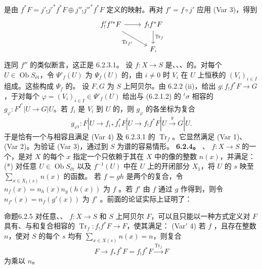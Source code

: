 是由 $f^*F=j'_!j'^*f^*F\oplus j''_!j''^*f^*F$ 定义的映射。再对 $f'=f\circ j'$ 应用 (Var 3)，得到
\[\begin{tikzcd}f'_!f'^*F\arrow[r]\arrow[dr,"\operatorname{Tr}_{f'}"']&f_!f^*F\arrow[d,"\operatorname{Tr}_f"]\\&F,\end{tikzcd}\]
连同 $f''$ 的类似断言，这正是 6.2.3.1。
设 $f:X\to S$ 是、、、的。对每个 $U\in\operatorname{Ob}S_{\text{ét}}$，令 $\Psi'_f(U)$ 为 $\Psi_f(U)$ 的，由 $i\ne0$ 时 $V_i$ 在 $U$ 上恒秩的 $(V_i)_{i\in I}$ 组成。这些构成 $\Psi_f$ 的。
设 $F,G$ 为 $S$ 上阿贝尔。由 6.2.2 (ii)，给出 $g:f_!f^*F\to G$，于对每个 $\varphi=(V_i)_{i\in I}\in\Psi'_f(U)$ 给出与 (6.2.1.2) 的 ${}^t\sigma$ 相容的 $g_\varphi:F^{I^*}|U\to G|U$。若 $f_i$ 是 $V_i$ 到 $U$ 的，则 $g_\varphi$ 的各坐标为复合
\[g_{\varphi i}:F|U\longrightarrow f_{i*}f_i^*F|U\longrightarrow f_!f^*F|U\xrightarrow{g}G|U.\]
于是恰有一个与相容且满足 (Var 4) 及 6.2.3.1 的 $\operatorname{Tr}_f$。它显然满足 (Var 1)、(Var 2)。为验证 (Var 3)，通过到 $S$ 为谱的容易情形。
\textbf{6.2.4。} 、 $f:X\to S$ 的一个，是对 $X$ 的每个 $x$ 指定一个只依赖于其在 $X$ 中的像的整数 $n(x)$，并满足：
(*) 对任意 $U\in\operatorname{Ob}S_{\text{ét}}$ 以及 $f^{-1}(U)$ 中在 $U$ 上的开闭部分 $X_1$，将 $U$ 的 $s$ 映至 $\sum_{x\in X_1(s)}n(x)$ 的函数。
若 $f=gh$ 是两个的复合，令 $n_f(x)=n_h(x)n_g(h(x))$ 为 $f$ 。若 $f'$ 由 $f$ 通过 $g$ 作得到，则令 $n_{f'}(x)=n_f(g'(x))$ 为 $f'$ 。前面的论证实际上证明了：
\begin{SGAresult}{命题}{6.2.5}
对任意、、 $f:X\to S$ 和 $S$ 上阿贝尔 $F$，可以且只能以一种方式定义对 $F$ 具有、与和复合相容的 $\operatorname{Tr}_f:f_!f^*F\to F$，使其满足：
(Var$'$ 4) 若 $f$ ，且存在整数 $n$，使对 $S$ 的每个 $s$ 均有 $\sum_{x\in X(s)}n(x)=n$，则复合
\[F\longrightarrow f_*f^*F=f_!f^*F\xrightarrow{\operatorname{Tr}_f}F\]
为乘以 $n$。
\end{SGAresult}
